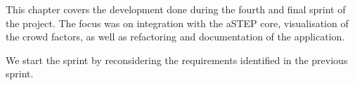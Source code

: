 This chapter covers the development done during the fourth and final sprint of the project. The focus was on integration with the aSTEP core, visualisation of the crowd factors, as well as refactoring and documentation of the application.

We start the sprint by reconsidering the requirements identified in the previous sprint. 